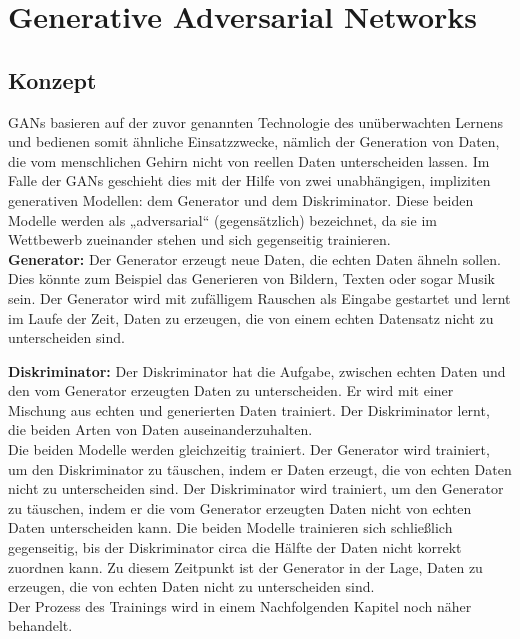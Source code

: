 \chapter{Generative Adversarial Networks}

\section{Konzept}

\noindent \acfp{GAN} basieren auf der zuvor genannten Technologie des unüberwachten Lernens und bedienen somit ähnliche Einsatzzwecke, nämlich der Generation von Daten, die vom menschlichen Gehirn nicht von reellen Daten unterscheiden lassen. Im Falle der \acp{GAN} geschieht dies mit der Hilfe von zwei unabhängigen, impliziten generativen Modellen: dem Generator und dem Diskriminator. Diese beiden Modelle werden als „adversarial“ (gegensätzlich) bezeichnet, da sie im Wettbewerb zueinander stehen und sich gegenseitig trainieren.  \\

\noindent \textbf{Generator:} Der Generator erzeugt neue Daten, die echten Daten ähneln sollen. Dies könnte zum Beispiel das Generieren von Bildern, Texten oder sogar Musik sein. Der Generator wird mit zufälligem Rauschen als Eingabe gestartet und lernt im Laufe der Zeit, Daten zu erzeugen, die von einem echten Datensatz nicht zu unterscheiden sind. 

\noindent \textbf{Diskriminator:} Der Diskriminator hat die Aufgabe, zwischen echten Daten und den vom Generator erzeugten Daten zu unterscheiden. Er wird mit einer Mischung aus echten und generierten Daten trainiert. Der Diskriminator lernt, die beiden Arten von Daten auseinanderzuhalten. \\

\noindent Die beiden Modelle werden gleichzeitig trainiert. Der Generator wird trainiert, um den Diskriminator zu täuschen, indem er Daten erzeugt, die von echten Daten nicht zu unterscheiden sind. Der Diskriminator wird trainiert, um den Generator zu täuschen, indem er die vom Generator erzeugten Daten nicht von echten Daten unterscheiden kann. Die beiden Modelle trainieren sich schließlich gegenseitig, bis der Diskriminator circa die Hälfte der Daten nicht korrekt zuordnen kann. Zu diesem Zeitpunkt ist der Generator in der Lage, Daten zu erzeugen, die von echten Daten nicht zu unterscheiden sind. \\

\noindent Der Prozess des Trainings wird in einem Nachfolgenden Kapitel noch näher behandelt. 

\newpage